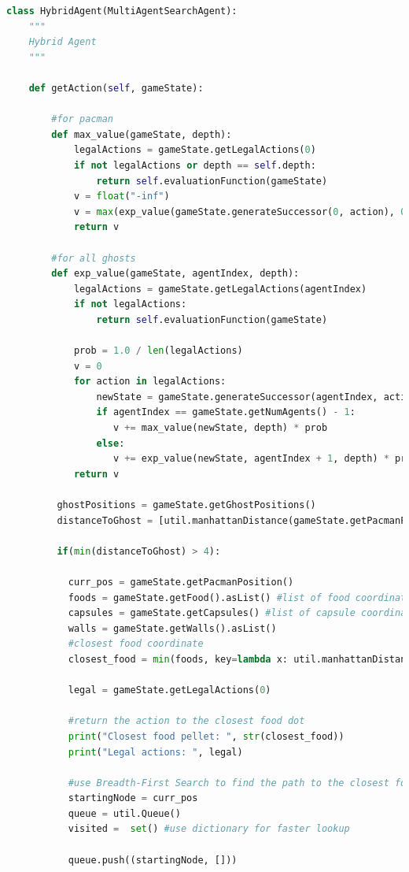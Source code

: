 \documentclass{article}
\begin{document}
	\begin{lstlisting}[language=Python, caption=The HybridAgent class]
class HybridAgent(MultiAgentSearchAgent):
	"""
	Hybrid Agent
	"""
	
	def getAction(self, gameState):
	
	    #for pacman
	    def max_value(gameState, depth):
	        legalActions = gameState.getLegalActions(0)
	        if not legalActions or depth == self.depth:
	            return self.evaluationFunction(gameState)
	        v = float("-inf")
	        v = max(exp_value(gameState.generateSuccessor(0, action), 0 + 1, depth + 1) for action in legalActions)
	        return v
	
	    #for all ghosts
	    def exp_value(gameState, agentIndex, depth):
	        legalActions = gameState.getLegalActions(agentIndex)
	        if not legalActions:
	            return self.evaluationFunction(gameState)
	
	        prob = 1.0 / len(legalActions)
	        v = 0
	        for action in legalActions:
	            newState = gameState.generateSuccessor(agentIndex, action)
	            if agentIndex == gameState.getNumAgents() - 1:
	               v += max_value(newState, depth) * prob
	            else:
	               v += exp_value(newState, agentIndex + 1, depth) * prob
	        return v
	
	     ghostPositions = gameState.getGhostPositions()
	     distanceToGhost = [util.manhattanDistance(gameState.getPacmanPosition(), ghost) for ghost in ghostPositions]
	
		 if(min(distanceToGhost) > 4):
	
	       curr_pos = gameState.getPacmanPosition()
	       foods = gameState.getFood().asList() #list of food coordinates
	       capsules = gameState.getCapsules() #list of capsule coordinates
	       walls = gameState.getWalls().asList()
	       #closest food coordinate
	       closest_food = min(foods, key=lambda x: util.manhattanDistance(curr_pos, x))
	
	       legal = gameState.getLegalActions(0)
	
	       #return the action to the closest food dot
	       print("Closest food pellet: ", str(closest_food))
	       print("Legal actions: ", legal)
	
	       #use Breadth-First Search to find the path to the closest food
	       startingNode = curr_pos 
	       queue = util.Queue()
	       visited =  set() #use dictionary for faster lookup
	
	       queue.push((startingNode, []))
	

\end{lstlisting}
\end{document}
